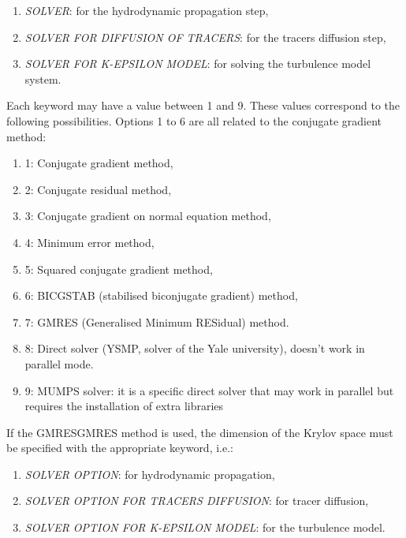 \begin{enumerate}
\item  \textit{SOLVER}: for the hydrodynamic propagation step,

\item  \textit{SOLVER FOR DIFFUSION OF TRACERS}: for the tracers diffusion step,

\item  \textit{SOLVER FOR K-EPSILON  MODEL}: for solving the turbulence model system.
\end{enumerate}

 Each keyword may have a value between 1 and 9. These values correspond to the following possibilities. Options 1 to 6 are all related to the conjugate gradient method:

\begin{enumerate}
\item  1: Conjugate gradient method,

\item  2: Conjugate residual method,

\item  3: Conjugate gradient on normal equation method,

\item  4: Minimum error method,

\item  5: Squared conjugate gradient method,

\item  6: BICGSTAB (stabilised biconjugate gradient) method,

\item  7: GMRES (Generalised Minimum RESidual) method.

\item  8: Direct solver (YSMP, solver of the Yale university), doesn't work in parallel mode.

\item  9: MUMPS solver: it is a specific direct solver that may work in parallel but requires the installation of extra libraries
\end{enumerate}

 If the GMRESGMRES method is used, the dimension of the Krylov space must be specified with the appropriate keyword, i.e.:

\begin{enumerate}
\item  \textit{SOLVER OPTION}: for hydrodynamic propagation,

\item  \textit{SOLVER OPTION FOR TRACERS DIFFUSION}: for tracer diffusion,

\item  \textit{SOLVER OPTION FOR K-EPSILON MODEL}: for the turbulence model.
\end{enumerate}

